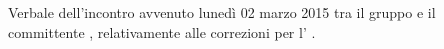 Verbale dell'incontro avvenuto lunedì 02 marzo 2015 tra il gruppo \gruppo e il committente \committenteAlt, relativamente alle correzioni per l' \AR.
